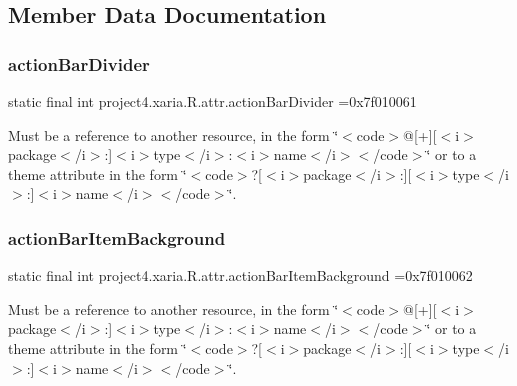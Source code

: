 \subsection{Member Data Documentation}
\mbox{\label{classproject4_1_1xaria_1_1R_1_1attr_a642e151cafea0d435b36d7450aa29724}} 
\subsubsection{\texorpdfstring{action\+Bar\+Divider}{actionBarDivider}}
{\footnotesize\ttfamily static final int project4.\+xaria.\+R.\+attr.\+action\+Bar\+Divider =0x7f010061\hspace{0.3cm}{\ttfamily [static]}}

Must be a reference to another resource, in the form \char`\"{}$<$code$>$@\mbox{[}+\mbox{]}\mbox{[}$<$i$>$package$<$/i$>$\+:\mbox{]}$<$i$>$type$<$/i$>$\+:$<$i$>$name$<$/i$>$$<$/code$>$\char`\"{} or to a theme attribute in the form \char`\"{}$<$code$>$?\mbox{[}$<$i$>$package$<$/i$>$\+:\mbox{]}\mbox{[}$<$i$>$type$<$/i$>$\+:\mbox{]}$<$i$>$name$<$/i$>$$<$/code$>$\char`\"{}. \mbox{\label{classproject4_1_1xaria_1_1R_1_1attr_a80b5be6125d2b9603b9b70c73528c836}} 
\subsubsection{\texorpdfstring{action\+Bar\+Item\+Background}{actionBarItemBackground}}
{\footnotesize\ttfamily static final int project4.\+xaria.\+R.\+attr.\+action\+Bar\+Item\+Background =0x7f010062\hspace{0.3cm}{\ttfamily [static]}}

Must be a reference to another resource, in the form \char`\"{}$<$code$>$@\mbox{[}+\mbox{]}\mbox{[}$<$i$>$package$<$/i$>$\+:\mbox{]}$<$i$>$type$<$/i$>$\+:$<$i$>$name$<$/i$>$$<$/code$>$\char`\"{} or to a theme attribute in the form \char`\"{}$<$code$>$?\mbox{[}$<$i$>$package$<$/i$>$\+:\mbox{]}\mbox{[}$<$i$>$type$<$/i$>$\+:\mbox{]}$<$i$>$name$<$/i$>$$<$/code$>$\char`\"{}. \mbox{\label{classproject4_1_1xaria_1_1R_1_1attr_a278e35181744e7d7ea6c0f1ccfb4ddea}} 
